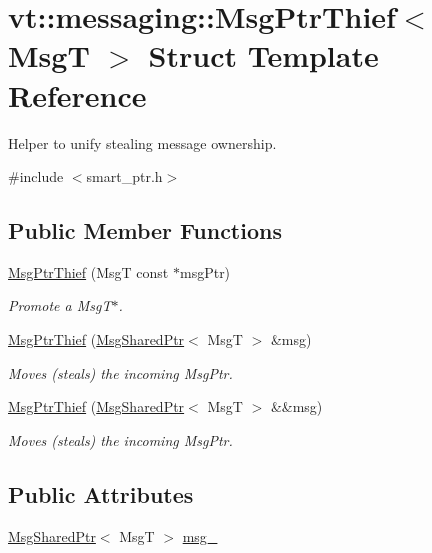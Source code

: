 \hypertarget{structvt_1_1messaging_1_1_msg_ptr_thief}{}\section{vt\+:\+:messaging\+:\+:Msg\+Ptr\+Thief$<$ MsgT $>$ Struct Template Reference}
\label{structvt_1_1messaging_1_1_msg_ptr_thief}


Helper to unify \textquotesingle{}stealing\textquotesingle{} message ownership.  




{\ttfamily \#include $<$smart\+\_\+ptr.\+h$>$}

\subsection*{Public Member Functions}
\begin{DoxyCompactItemize}
\item 
\hyperlink{structvt_1_1messaging_1_1_msg_ptr_thief_a2055f2033d36e710bbb5247f76520d5a}{Msg\+Ptr\+Thief} (MsgT const $\ast$msg\+Ptr)
\begin{DoxyCompactList}\small\item\em Promote a {\ttfamily Msg\+T$\ast$}. \end{DoxyCompactList}\item 
\hyperlink{structvt_1_1messaging_1_1_msg_ptr_thief_a6f24dfa36e04c82511704c05d0904de1}{Msg\+Ptr\+Thief} (\hyperlink{structvt_1_1messaging_1_1_msg_shared_ptr}{Msg\+Shared\+Ptr}$<$ MsgT $>$ \&msg)
\begin{DoxyCompactList}\small\item\em Moves (steals) the incoming Msg\+Ptr. \end{DoxyCompactList}\item 
\hyperlink{structvt_1_1messaging_1_1_msg_ptr_thief_aed4e66a07cc56e9db883a66270682d02}{Msg\+Ptr\+Thief} (\hyperlink{structvt_1_1messaging_1_1_msg_shared_ptr}{Msg\+Shared\+Ptr}$<$ MsgT $>$ \&\&msg)
\begin{DoxyCompactList}\small\item\em Moves (steals) the incoming Msg\+Ptr. \end{DoxyCompactList}\end{DoxyCompactItemize}
\subsection*{Public Attributes}
\begin{DoxyCompactItemize}
\item 
\hyperlink{structvt_1_1messaging_1_1_msg_shared_ptr}{Msg\+Shared\+Ptr}$<$ MsgT $>$ \hyperlink{structvt_1_1messaging_1_1_msg_ptr_thief_abc3b141a75ff7a89467d5551384a49ce}{msg\+\_\+}
\end{DoxyCompactItemize}


